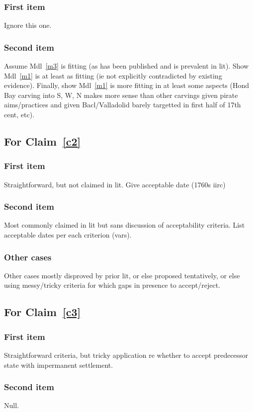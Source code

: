 \documentclass{amsart}
\theoremstyle{definition}%
\theoremstyle{definition}%
\theoremstyle{remark}%
\begin{document}
\subsubsection{First item} Ignore this one.
\subsubsection{Second item} Assume Mdl~\ref{m3} is fitting (as has been published and is prevalent in lit). Show Mdl~\ref{m1} is at least as fitting (ie not explicitly contradicted by existing evidence). Finally, show Mdl~\ref{m1} is more fitting in at least some aspects (Hond Bay carving into S, W, N makes more sense than other carvings given pirate aims/practices and given Bacl/Valladolid barely targetted in first half of 17th cent, etc).
%
%
%
%
\subsection{For Claim~\ref{c2}}
\subsubsection{First item} Straightforward, but not claimed in lit. Give acceptable date (1760s iirc)
\subsubsection{Second item} Most commonly claimed in lit but sans discussion of acceptability criteria. List acceptable dates per each criterion (vars).
\subsubsection{Other cases} Other cases mostly disproved by prior lit, or else proposed tentatively, or else using messy/tricky criteria for which gaps in presence to accept/reject.
%
%
%
%
\subsection{For Claim~\ref{c3}}
\subsubsection{First item} Straightforward criteria, but tricky application re whether to accept predecessor state with impermanent settlement.
\subsubsection{Second item} Null.
\end{document}
